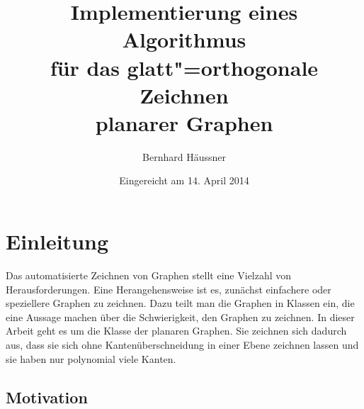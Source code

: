 \documentclass[a4paper]{scrreprt}
\theoremstyle{definition}
\begin{document}


\subject{Bachelorarbeit}
\title{Implementierung eines Algorithmus\\ für das glatt"=orthogonale Zeichnen \\ planarer Graphen} %
\author{Bernhard Häussner} %
\date{Eingereicht am 14. April 2014} %
\titlehead{Julius-Maximilians-Universität Würzburg\\
Institut für Informatik\\
Lehrstuhl für Informatik I\\
Effiziente Algorithmen und wissensbasierte Systeme}
\publishers{Betreuer:\\
Prof.\ Dr.\ Alexander Wolff\\
Dipl.-Inf.\ Philipp Kindermann} %
\maketitle
\tableofcontents





\chapter{Einleitung}
\label{chap:intro}

Das automatisierte Zeichnen von Graphen stellt eine Vielzahl von Herausforderungen. 
Eine Herangehensweise ist es, zunächst einfachere oder speziellere Graphen zu zeichnen. 
Dazu teilt man die Graphen in Klassen ein, die eine Aussage machen über die Schwierigkeit, den Graphen zu zeichnen. 
In dieser Arbeit geht es um die Klasse der planaren Graphen. Sie zeichnen sich dadurch aus, dass sie sich ohne Kantenüberschneidung in einer Ebene zeichnen lassen und sie haben nur polynomial viele Kanten.

\section{Motivation}
\end{document}
